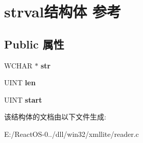\hypertarget{structstrval}{}\section{strval结构体 参考}
\label{structstrval}
\subsection*{Public 属性}
\begin{DoxyCompactItemize}
\item 
\mbox{\label{structstrval_a3a341cc971b5378dff006c1965894ae6}} 
W\+C\+H\+AR $\ast$ {\bfseries str}
\item 
\mbox{\label{structstrval_a551c8e2faf7483cd6b89f43f89488e5b}} 
U\+I\+NT {\bfseries len}
\item 
\mbox{\label{structstrval_a0e99bb9bc86d6fefb5c0dfd2b0432512}} 
U\+I\+NT {\bfseries start}
\end{DoxyCompactItemize}


该结构体的文档由以下文件生成\+:\begin{DoxyCompactItemize}
\item 
E\+:/\+React\+O\+S-\/0../dll/win32/xmllite/reader.\+c\end{DoxyCompactItemize}
